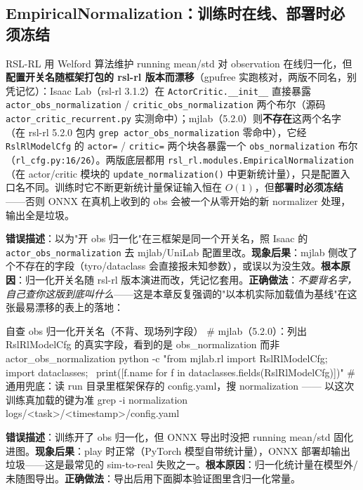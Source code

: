 \subsection{EmpiricalNormalization：训练时在线、部署时必须冻结}

RSL-RL 用 Welford 算法维护 running mean/std 对 observation 在线归一化，但\textbf{配置开关名随框架打包的 rsl-rl 版本而漂移}（gpufree 实跑核对，两版不同名，别凭记忆）：Isaac Lab（rsl-rl 3.1.2）在 \verb|ActorCritic.__init__| 直接暴露 \verb|actor_obs_normalization| / \verb|critic_obs_normalization| 两个布尔（源码 \verb|actor_critic_recurrent.py| 实测命中）；mjlab（5.2.0）则\textbf{不存在}这两个名字（在 rsl-rl 5.2.0 包内 \verb|grep actor_obs_normalization| 零命中），它经 \verb|RslRlModelCfg| 的 \verb|actor=| / \verb|critic=| 两个块各暴露一个 \verb|obs_normalization| 布尔（\verb|rl_cfg.py:16/26|）。两版底层都用 \verb|rsl_rl.modules.EmpiricalNormalization|（在 actor/critic 模块的 \verb|update_normalization()| 中更新统计量），只是配置入口名不同。训练时它不断更新统计量保证输入恒在 $O(1)$，但\textbf{部署时必须冻结}——否则 ONNX 在真机上收到的 obs 会被一个从零开始的新 normalizer 处理，输出全是垃圾。

\begin{pitfall}
\textbf{错误描述}：以为"开 obs 归一化"在三框架是同一个开关名，照 Isaac 的 \verb|actor_obs_normalization| 去 mjlab/UniLab 配置里改。\textbf{现象后果}：mjlab 侧改了个不存在的字段（tyro/dataclass 会直接报未知参数），或误以为没生效。\textbf{根本原因}：归一化开关名随 rsl-rl 版本演进而改，凭记忆套用。\textbf{正确做法}：\emph{不要背名字，自己查你这版到底叫什么}——这是本章反复强调的"以本机实际加载值为基线"在这张最易漂移的表上的落地：
\begin{codebox}[bash]{自查 obs 归一化开关名（不背、现场列字段）}
# mjlab（5.2.0）：列出 RslRlModelCfg 的真实字段，看到的是 obs_normalization 而非 actor_obs_normalization
python -c "from mjlab.rl import RslRlModelCfg; import dataclasses; \
print([f.name for f in dataclasses.fields(RslRlModelCfg)])"
# 通用兜底：读 run 目录里框架保存的 config.yaml，搜 normalization —— 以这次训练真加载的键为准
grep -i normalization logs/<task>/<timestamp>/config.yaml
\end{codebox}
\end{pitfall}

\begin{pitfall}
\textbf{错误描述}：训练开了 obs 归一化，但 ONNX 导出时没把 running mean/std 固化进图。\textbf{现象后果}：play 时正常（PyTorch 模型自带统计量），ONNX 部署却输出垃圾——这是最常见的 sim-to-real 失败之一。\textbf{根本原因}：归一化统计量在模型外/未随图导出。\textbf{正确做法}：导出后用下面脚本验证图里含归一化常量。
\end{pitfall}

